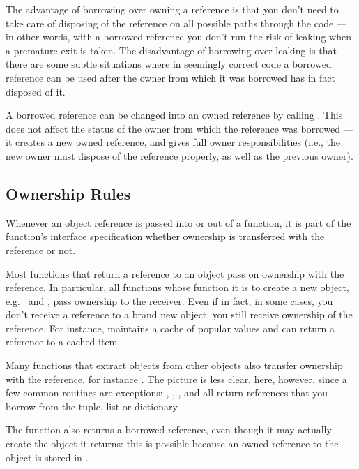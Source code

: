 \documentclass{manual}
\begin{document}
The advantage of borrowing over owning a reference is that you don't
need to take care of disposing of the reference on all possible paths
through the code --- in other words, with a borrowed reference you
don't run the risk of leaking when a premature exit is taken.  The
disadvantage of borrowing over leaking is that there are some subtle
situations where in seemingly correct code a borrowed reference can be
used after the owner from which it was borrowed has in fact disposed
of it.

A borrowed reference can be changed into an owned reference by calling
.  This does not affect the status of the owner from
which the reference was borrowed --- it creates a new owned reference,
and gives full owner responsibilities (i.e., the new owner must
dispose of the reference properly, as well as the previous owner).


\subsection{Ownership Rules
            \label{ownershipRules}}

Whenever an object reference is passed into or out of a function, it
is part of the function's interface specification whether ownership is
transferred with the reference or not.

Most functions that return a reference to an object pass on ownership
with the reference.  In particular, all functions whose function it is
to create a new object, e.g.\  and
, pass ownership to the receiver.  Even if in
fact, in some cases, you don't receive a reference to a brand new
object, you still receive ownership of the reference.  For instance,
 maintains a cache of popular values and can
return a reference to a cached item.

Many functions that extract objects from other objects also transfer
ownership with the reference, for instance
.  The picture is less clear, here,
however, since a few common routines are exceptions:
, ,
, and 
all return references that you borrow from the tuple, list or
dictionary.

The function  also returns a borrowed
reference, even though it may actually create the object it returns:
this is possible because an owned reference to the object is stored in
.
\end{document}
